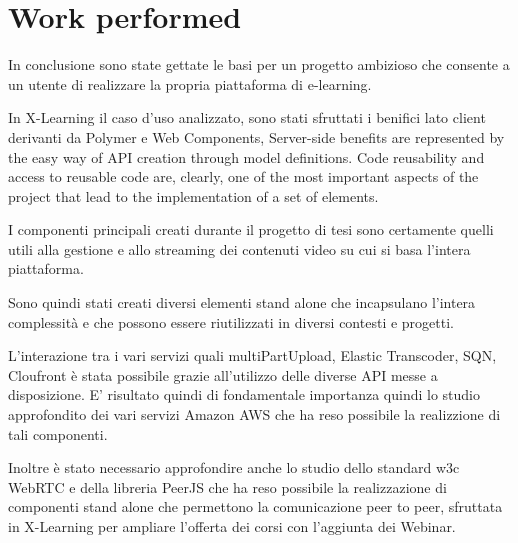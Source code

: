 \section{Work performed}
\label{sec:work_performed}
 
In conclusione sono state gettate le basi per un progetto ambizioso che consente a un utente di realizzare la propria piattaforma di e-learning.

In X-Learning il caso d'uso analizzato, sono stati sfruttati i benifici lato client derivanti da Polymer e Web Components, Server-side benefits are represented by the easy way of API creation through model definitions.
Code reusability and access to reusable code are, clearly, one of the most important aspects of the project that lead to the implementation of a set of elements.

I componenti principali creati durante il progetto di tesi sono certamente quelli utili alla gestione e allo streaming dei contenuti video su cui si basa l'intera piattaforma.

Sono quindi stati creati diversi elementi stand alone che incapsulano l'intera complessità e che possono essere riutilizzati in diversi contesti e progetti.

L'interazione tra i vari servizi quali multiPartUpload, Elastic Transcoder, SQN, Cloufront è stata possibile grazie all'utilizzo delle diverse API messe a disposizione.
E' risultato quindi di fondamentale importanza quindi lo studio approfondito dei vari servizi Amazon AWS che ha reso possibile la realizzione di tali componenti.

Inoltre è stato necessario approfondire anche lo studio dello standard w3c WebRTC e della libreria PeerJS che ha reso possibile la realizzazione di componenti stand alone che permettono la comunicazione peer to peer, sfruttata in X-Learning per ampliare l'offerta dei corsi con l'aggiunta dei Webinar.